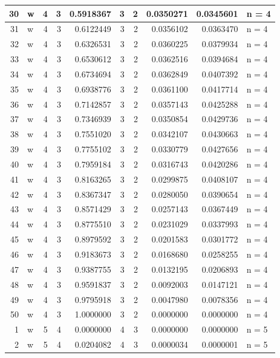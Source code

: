 \documentclass[
  letterpaper,
  DIV=11,
  numbers=noendperiod]{scrreprt}
\begin{document}
\begin{table}
\begin{tabular}[t]{r|l|r|r|r|r|r|r|r|l}
\hline
30 & w & 4 & 3 & 0.5918367 & 3 & 2 & 0.0350271 & 0.0345601 & n = 4\\
\hline
31 & w & 4 & 3 & 0.6122449 & 3 & 2 & 0.0356102 & 0.0363470 & n = 4\\
\hline
32 & w & 4 & 3 & 0.6326531 & 3 & 2 & 0.0360225 & 0.0379934 & n = 4\\
\hline
33 & w & 4 & 3 & 0.6530612 & 3 & 2 & 0.0362516 & 0.0394684 & n = 4\\
\hline
34 & w & 4 & 3 & 0.6734694 & 3 & 2 & 0.0362849 & 0.0407392 & n = 4\\
\hline
35 & w & 4 & 3 & 0.6938776 & 3 & 2 & 0.0361100 & 0.0417714 & n = 4\\
\hline
36 & w & 4 & 3 & 0.7142857 & 3 & 2 & 0.0357143 & 0.0425288 & n = 4\\
\hline
37 & w & 4 & 3 & 0.7346939 & 3 & 2 & 0.0350854 & 0.0429736 & n = 4\\
\hline
38 & w & 4 & 3 & 0.7551020 & 3 & 2 & 0.0342107 & 0.0430663 & n = 4\\
\hline
39 & w & 4 & 3 & 0.7755102 & 3 & 2 & 0.0330779 & 0.0427656 & n = 4\\
\hline
40 & w & 4 & 3 & 0.7959184 & 3 & 2 & 0.0316743 & 0.0420286 & n = 4\\
\hline
41 & w & 4 & 3 & 0.8163265 & 3 & 2 & 0.0299875 & 0.0408107 & n = 4\\
\hline
42 & w & 4 & 3 & 0.8367347 & 3 & 2 & 0.0280050 & 0.0390654 & n = 4\\
\hline
43 & w & 4 & 3 & 0.8571429 & 3 & 2 & 0.0257143 & 0.0367449 & n = 4\\
\hline
44 & w & 4 & 3 & 0.8775510 & 3 & 2 & 0.0231029 & 0.0337993 & n = 4\\
\hline
45 & w & 4 & 3 & 0.8979592 & 3 & 2 & 0.0201583 & 0.0301772 & n = 4\\
\hline
46 & w & 4 & 3 & 0.9183673 & 3 & 2 & 0.0168680 & 0.0258255 & n = 4\\
\hline
47 & w & 4 & 3 & 0.9387755 & 3 & 2 & 0.0132195 & 0.0206893 & n = 4\\
\hline
48 & w & 4 & 3 & 0.9591837 & 3 & 2 & 0.0092003 & 0.0147121 & n = 4\\
\hline
49 & w & 4 & 3 & 0.9795918 & 3 & 2 & 0.0047980 & 0.0078356 & n = 4\\
\hline
50 & w & 4 & 3 & 1.0000000 & 3 & 2 & 0.0000000 & 0.0000000 & n = 4\\
\hline
1 & w & 5 & 4 & 0.0000000 & 4 & 3 & 0.0000000 & 0.0000000 & n = 5\\
\hline
2 & w & 5 & 4 & 0.0204082 & 4 & 3 & 0.0000034 & 0.0000001 & n = 5\\

\end{tabular}
\end{table}
\end{document}
